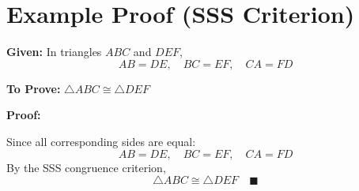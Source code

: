\documentclass[12pt]{article}
\begin{document}
\section{Example Proof (SSS Criterion)}

\textbf{Given:} In triangles $ABC$ and $DEF$,  
\[
AB = DE,\quad BC = EF,\quad CA = FD
\]

\textbf{To Prove:} $\triangle ABC \cong \triangle DEF$

\textbf{Proof:}

Since all corresponding sides are equal:
\[
AB = DE,\quad BC = EF,\quad CA = FD
\]
By the SSS congruence criterion,  
\[
\triangle ABC \cong \triangle DEF \quad \blacksquare
\]
\end{document}
